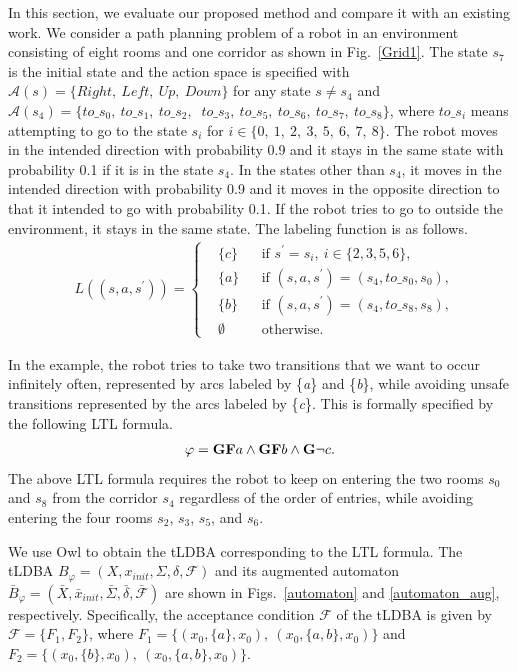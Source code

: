 \documentclass[letterpaper, 10 pt, conference]{ieeeconf}  %
\begin{document}
In this section, we evaluate our proposed method and compare it with an existing work.
We consider a path planning problem of a robot in an environment consisting of eight rooms and one corridor as shown in Fig.\ \ref{Grid1}. The state $s_7$ is the initial state and the action space is specified with $\mathcal{A}(s) = \{ Right,\ Left,\ Up,\ Down \}$ for any state $s \neq s_4$ and $\mathcal{A}(s_4) = \{ to\_s_0,\ to\_s_1,\ to\_s_2,$ $\ to\_s_3,\ to\_s_5,\ to\_s_6,\ to\_s_7,\ to\_s_8 \}$, where $to\_s_i$ means attempting to go to the state $s_i$ for $i \in \{0,\ 1,\ 2,\ 3,\ 5,\ 6,\ 7,\ 8 \}$. The robot moves in the intended direction with probability 0.9 and it stays in the same state with probability 0.1 if it is in the state $s_4$. In the states other than $s_4$, it moves in the intended direction with probability 0.9 and it moves in the opposite direction to that it intended to go with probability 0.1. If the robot tries to go to outside the environment, it stays in the same state. The labeling function is as follows.
\begin{align*}
      & L((s, a, s^{\prime})) =
      \left\{
      \begin{aligned}
        & \{ c \} &  & \text{if }s^{\prime} = s_i,\ i \in \{ 2,3,5,6 \}, \nonumber \\
        & \{ a \} &  & \text{if }(s,a,s^{\prime})=(s_4,to\_s_0,s_0), \nonumber \\
        & \{ b \} &  & \text{if }(s,a,s^{\prime})=(s_4,to\_s_8, s_8), \nonumber \\
        & \emptyset &  & \text{otherwise}.
      \end{aligned}
      \right.
    \end{align*}

In the example, the robot tries to take two transitions that we want to occur infinitely often, represented by arcs labeled by \{{\it a}\} and \{{\it b}\}, while avoiding unsafe transitions represented by the arcs labeled by \{{\it c}\}. This is formally specified by the following LTL formula.
\begin{align*}
  \varphi = \text{{\bf GF}}a \wedge \text{{\bf GF}}b \wedge \text{{\bf G}}\neg c.
\end{align*}
The above LTL formula requires the robot to keep on entering the two rooms $s_0$ and $s_8$ from the corridor $s_4$ regardless of the order of entries, while avoiding entering the four rooms $s_2$, $s_3$, $s_5$, and $s_6$.

We use Owl \cite{Owl} to obtain the tLDBA corresponding to the LTL formula.
The tLDBA $B_{\varphi} = (X, x_{init},\Sigma,\delta,\mathcal{F})$ and its augmented automaton $\bar{B}_{\varphi} = (\bar{X},\bar{x}_{init},\bar{\Sigma},\bar{\delta},\bar{\mathcal{F}})$ are shown in Figs.\ \ref{automaton} and \ref{automaton_aug}, respectively. Specifically, the acceptance condition ${\mathcal F}$ of the tLDBA is given by ${\mathcal F} = \{ F_1,F_2 \}$, where $F_1=\{ (x_0, \{ a \}, x_0),\ (x_0, \{ a,b \}, x_0) \}$ and $F_2 = \{ (x_0, \{ b \}, x_0),\ (x_0, \{ a,b \}, x_0) \}$.
\end{document}
